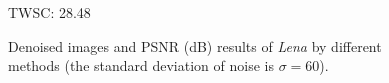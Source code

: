 \begin{figure}[t!]
{\begin{minipage}[t]{0.19\textwidth}
{\footnotesize TWSC: 28.48}
\end{minipage}
}\vspace{-3mm}
\caption{Denoised images and PSNR (dB) results of \textsl{Lena} by different methods (the standard deviation of noise is $\sigma=60$).}
    \label{fig5-4}
\end{figure}

\begin{figure}[t!]
    \centering
{}
\end{figure}
